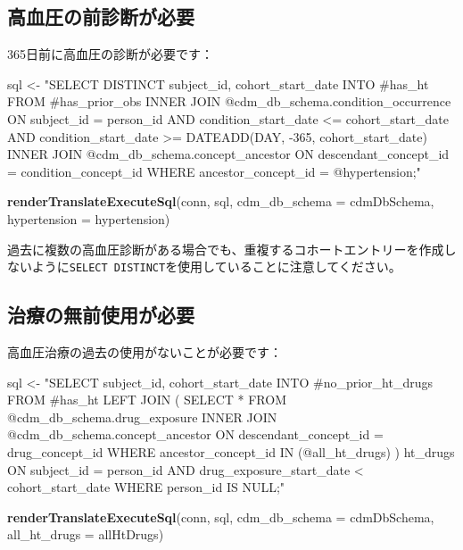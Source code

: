 \documentclass[
  11pt]{book}
\newenvironment{Shaded}{\begin{snugshade}}{\end{snugshade}}
\newcommand{\AttributeTok}[1]{\textcolor[rgb]{0.13,0.29,0.53}{#1}}
\newcommand{\FunctionTok}[1]{\textcolor[rgb]{0.13,0.29,0.53}{\textbf{#1}}}
\newcommand{\NormalTok}[1]{#1}
\newcommand{\OtherTok}[1]{\textcolor[rgb]{0.56,0.35,0.01}{#1}}
\newcommand{\StringTok}[1]{\textcolor[rgb]{0.31,0.60,0.02}{#1}}
\theoremstyle{definition}
\theoremstyle{definition}
\theoremstyle{definition}
\theoremstyle{definition}
\theoremstyle{remark}
\begin{document}
\subsection{高血圧の前診断が必要}\label{ux9ad8ux8840ux5727ux306eux524dux8a3aux65adux304cux5fc5ux8981}

365日前に高血圧の診断が必要です：

\begin{Shaded}
\begin{Highlighting}[]
\NormalTok{sql }\OtherTok{\textless{}{-}} \StringTok{"SELECT DISTINCT subject\_id,}
\StringTok{  cohort\_start\_date}
\StringTok{INTO \#has\_ht}
\StringTok{FROM \#has\_prior\_obs}
\StringTok{INNER JOIN @cdm\_db\_schema.condition\_occurrence}
\StringTok{  ON subject\_id = person\_id}
\StringTok{    AND condition\_start\_date \textless{}= cohort\_start\_date}
\StringTok{    AND condition\_start\_date \textgreater{}= DATEADD(DAY, {-}365, cohort\_start\_date)}
\StringTok{INNER JOIN @cdm\_db\_schema.concept\_ancestor}
\StringTok{  ON descendant\_concept\_id = condition\_concept\_id}
\StringTok{WHERE ancestor\_concept\_id = @hypertension;"}

\FunctionTok{renderTranslateExecuteSql}\NormalTok{(conn,}
\NormalTok{                          sql,}
                          \AttributeTok{cdm\_db\_schema =}\NormalTok{ cdmDbSchema,}
                          \AttributeTok{hypertension =}\NormalTok{ hypertension)}
\end{Highlighting}
\end{Shaded}

過去に複数の高血圧診断がある場合でも、重複するコホートエントリーを作成しないように\texttt{SELECT\ DISTINCT}を使用していることに注意してください。

\subsection{治療の無前使用が必要}\label{ux6cbbux7642ux306eux7121ux524dux4f7fux7528ux304cux5fc5ux8981}

高血圧治療の過去の使用がないことが必要です：

\begin{Shaded}
\begin{Highlighting}[]
\NormalTok{sql }\OtherTok{\textless{}{-}} \StringTok{"SELECT subject\_id,}
\StringTok{  cohort\_start\_date}
\StringTok{INTO \#no\_prior\_ht\_drugs}
\StringTok{FROM \#has\_ht}
\StringTok{LEFT JOIN (}
\StringTok{  SELECT *}
\StringTok{  FROM @cdm\_db\_schema.drug\_exposure}
\StringTok{  INNER JOIN @cdm\_db\_schema.concept\_ancestor}
\StringTok{    ON descendant\_concept\_id = drug\_concept\_id}
\StringTok{  WHERE ancestor\_concept\_id IN (@all\_ht\_drugs)}
\StringTok{) ht\_drugs}
\StringTok{  ON subject\_id = person\_id}
\StringTok{    AND drug\_exposure\_start\_date \textless{} cohort\_start\_date}
\StringTok{WHERE person\_id IS NULL;"}

\FunctionTok{renderTranslateExecuteSql}\NormalTok{(conn,}
\NormalTok{                          sql,}
                          \AttributeTok{cdm\_db\_schema =}\NormalTok{ cdmDbSchema,}
                          \AttributeTok{all\_ht\_drugs =}\NormalTok{ allHtDrugs)}
\end{Highlighting}
\end{Shaded}
\end{document}
